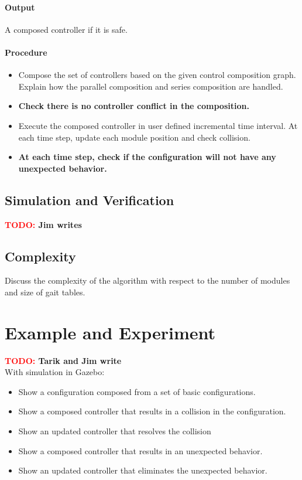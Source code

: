 \documentclass[conference]{IEEEtran}
\theoremstyle{definition}
\newcommand{\TODO}[1]{ {\bf \textcolor{red}{TODO:} #1 }}
\begin{document}
\paragraph{Output}
A composed controller if it is safe.
\paragraph{Procedure}
\begin{itemize}
\item Compose the set of controllers based on the given control composition graph. Explain how the parallel composition and series composition are handled.
\item\textbf{Check there is no controller conflict in the composition.}
\item Execute the composed controller in user defined incremental time interval. At each time step, update each module position and check collision.
\item \textbf{At each time step, check if the configuration will not have any unexpected behavior.}
\end{itemize}

\subsection{Simulation and Verification}
\TODO{Jim writes}

\subsection{Complexity}
Discuss the complexity of the algorithm with respect to the number of modules and size of gait tables.

\section{Example and Experiment}
\label{sec:example}
\TODO{Tarik and Jim write}\\
With simulation in Gazebo:
\begin{itemize}
\item Show a configuration composed from a set of basic configurations.
\item Show a composed controller that results in a collision in the configuration.
\item Show an updated controller that resolves the collision
\item Show a composed controller that results in an unexpected behavior.
\item Show an updated controller that eliminates the unexpected behavior.
\end{itemize}
\end{document}
